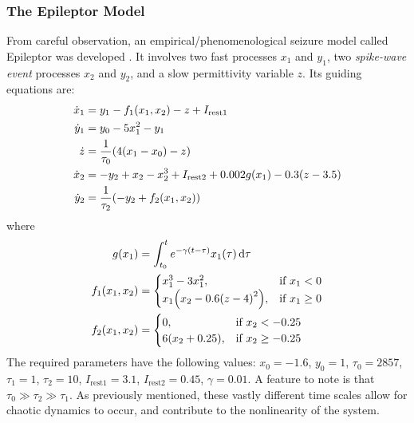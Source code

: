\subsubsection{The Epileptor Model}
\label{sec:intro_seizures_aetiology_epileptor}
From careful observation, an empirical/phenomenological seizure model called Epileptor was developed \cite{Jirsa2014,Jirsa2017}.
It involves two fast processes $x_{1}$ and $y_{1}$, two \textit{spike-wave event} processes $x_{2}$ and $y_{2}$, and a slow permittivity variable $z$.
Its guiding equations are:
\begin{align}
  \label{eq:epileptor_x1}
  \dot{x}_{1}
  &=
    y_{1}
    -
    f_{1}(x_{1}, x_{2})
    -
    z
    +
    I_{\text{rest} 1} \\
  \label{eq:epileptor_y1}
  \dot{y}_{1}
  &=
    y_{0}
    -
    5 x_{1}^{2}
    -
    y_{1} \\
  \label{eq:epileptor_z}
  \dot{z}
  &=
    \frac{1}{\tau_{0}} \pqty{4 \pqty{x_{1} - x_{0}} - z} \\
  \label{eq:epileptor_x2}
  \dot{x}_{2}
  &=
    -y_{2}
    +
    x_{2}
    -
    x_{2}^{3}
    +
    I_{\text{rest} 2}
    +
    0.002 g(x_{1})
    -
    0.3 \pqty{z - 3.5} \\
  \label{eq:epileptor_y2}
  \dot{y}_{2}
  &=
    \frac{1}{\tau_{2}} \pqty{-y_{2} + f_{2}(x_{1}, x_{2})}
\end{align}
where
\begin{align}
  \label{eq:epileptor_g}
  g(x_{1})
  &=
    \int_{t_{0}}^{t}{e^{-\gamma \pqty{t - \tau}} x_{1}(\tau) \dd{\tau}} \\
  \label{eq:epileptor_f1}
  f_{1}(x_{1}, x_{2})
  &=
    \begin{cases}
      x_{1}^{3} - 3 x_{1}^{2},
      & \text{if } x_{1} < 0 \\
      x_{1} \pqty{x_{2} - 0.6 \pqty{z - 4}^{2}},
      & \text{if }
      x_{1} \geq 0
    \end{cases} \\
  \label{eq:epileptor_f2}
  f_{2}(x_{1}, x_{2})
  &=
    \begin{cases}
      0,
      & \text{if } x_{2} < -0.25 \\
      6 \pqty{x_{2} + 0.25},
      & \text{if } x_{2} \geq -0.25
    \end{cases}
\end{align}
The required parameters have the following values: $x_{0} = -1.6$, $y_{0} = 1$, $\tau_{0} = 2857$, $\tau_{1} = 1$, $\tau_{2} = 10$, $I_{\text{rest} 1} = 3.1$, $I_{\text{rest} 2} = 0.45$, $\gamma = 0.01$.
A feature to note is that $\tau_{0} \gg \tau_{2} \gg \tau_{1}$.
As previously mentioned, these vastly different time scales allow for chaotic dynamics to occur, and contribute to the nonlinearity of the system.

